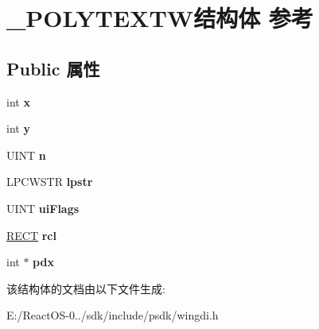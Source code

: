 \hypertarget{struct___p_o_l_y_t_e_x_t_w}{}\section{\+\_\+\+P\+O\+L\+Y\+T\+E\+X\+T\+W结构体 参考}
\label{struct___p_o_l_y_t_e_x_t_w}
\subsection*{Public 属性}
\begin{DoxyCompactItemize}
\item 
\mbox{\label{struct___p_o_l_y_t_e_x_t_w_a694a4285c3f4dfeab38d58e526780f15}} 
int {\bfseries x}
\item 
\mbox{\label{struct___p_o_l_y_t_e_x_t_w_a8fadcf13034c79994687a81ae7513f98}} 
int {\bfseries y}
\item 
\mbox{\label{struct___p_o_l_y_t_e_x_t_w_a64fd90d75e15147b55fd602fa7f90696}} 
U\+I\+NT {\bfseries n}
\item 
\mbox{\label{struct___p_o_l_y_t_e_x_t_w_a205ef31e1c05948bfaba00c24a3c8642}} 
L\+P\+C\+W\+S\+TR {\bfseries lpstr}
\item 
\mbox{\label{struct___p_o_l_y_t_e_x_t_w_a29d57cd2253ef92b6b85bdd3d4129708}} 
U\+I\+NT {\bfseries ui\+Flags}
\item 
\mbox{\label{struct___p_o_l_y_t_e_x_t_w_a64d1466c31e58b8fab104035f59f1c12}} 
\hyperlink{structtag_r_e_c_t}{R\+E\+CT} {\bfseries rcl}
\item 
\mbox{\label{struct___p_o_l_y_t_e_x_t_w_aad3e3a778919a0a15737da9c976bb389}} 
int $\ast$ {\bfseries pdx}
\end{DoxyCompactItemize}


该结构体的文档由以下文件生成\+:\begin{DoxyCompactItemize}
\item 
E\+:/\+React\+O\+S-\/0../sdk/include/psdk/wingdi.\+h\end{DoxyCompactItemize}

